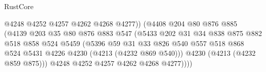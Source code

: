 \begin{lexlean}{RustCore}
\begin{coremodule}
                                            @4248
                                            @4252
                                            @4257
                                            @4262
                                            @4268
                                            @4277))
                                        (@4408
                                          @204
                                          @80
                                          @876
                                          @885
                                          (@4139
                                            @203
                                            @35
                                            @80
                                            @876
                                            @883
                                            @547
                                            (@5433
                                              @202
                                              @31
                                              @34
                                              @838
                                              @875
                                              @882
                                              @518
                                              @858
                                              @524
                                              @5459
                                              (@5396
                                                @59
                                                @31
                                                @33
                                                @826
                                                @540
                                                @557
                                                @518
                                                @868
                                                @524
                                                @5431
                                                @4226
                                                @4230
                                                (@4213 (@4232 @869 @540)))
                                              @4230
                                              (@4213 (@4232 @859 @875)))
                                            @4248
                                            @4252
                                            @4257
                                            @4262
                                            @4268
                                            @4277))))

\end{coremodule}
\end{lexlean}
